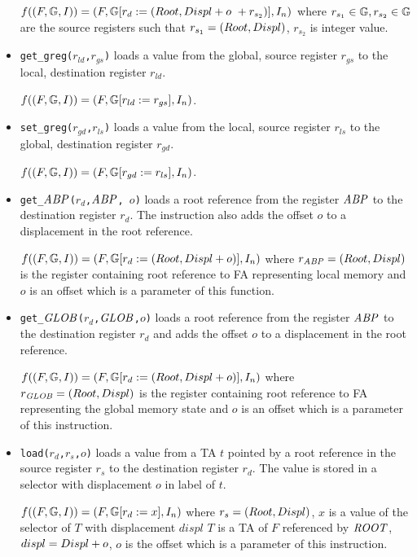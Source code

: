 \begin{itemize}
		$f((F, \mathbb{G}, I)) = (F, \mathbb{G} [r_d := (Root,Displ + o~+ r_{s_2})], I_n)$
		where $r_{s_1} \in \mathbb{G}, r_{s_2} \in \mathbb{G}$ are the source registers such that
		$r_{s_1}=(Root,Displ)$, $r_{s_2}$ is integer value.
	
	\item {\tt get\_greg($r_{ld}$,$r_{gs}$)} loads a value from the global, source register $r_{gs}$ to
		the local, destination register $r_{ld}$.
		
		$f((F, \mathbb{G}, I)) = (F, \mathbb{G} [r_{ld} := r_{gs}], I_n)$.
	
	\item {\tt set\_greg($r_{gd}$,$r_{ls}$)} loads a value from the local, source register $r_{ls}$ to
		the global, destination register $r_{gd}$.
		
		$f((F, \mathbb{G}, I)) = (F, \mathbb{G} [r_{gd} := r_{ls}], I_n)$.
	
	\item {\tt get\_$\mathit{ABP}$($r_d$,$\mathit{ABP}$, $o$)} loads a root reference from the register $\mathit{ABP}$ to
		the destination register $r_d$. The instruction also adds the offset $o$ to a displacement
		in the root reference.

		$f((F, \mathbb{G}, I)) = (F, \mathbb{G} [r_d := 
			(Root,Displ + o)], I_n)$ where $r_{\mathit{ABP}}=(Root,Displ)$ is the register containing root
		reference to FA representing local memory and $o$ is an offset
		which is a parameter of this function.
	
	\item {\tt get\_$\mathit{GLOB}$($r_d$,$\mathit{GLOB}$,$o$)} loads a root reference from the register $\mathit{ABP}$
		to the destination register $r_d$ and adds the offset $o$ to a displacement in the root reference.
		
		$f((F, \mathbb{G}, I)) = (F, \mathbb{G} [r_{d} := 
				(Root,Displ + o)
			], I_n)$ where $r_{\mathit{GLOB}}=(Root,Displ)$ is the register containing root
			reference to FA representing the global memory state and $o$ is an offset
			which is a parameter of this instruction.
	
	\item {\tt load($r_d$,$r_s$,$o$)} loads a value from a TA $t$ pointed
		by a root reference in the source register $r_s$ to the destination register $r_d$.
		The value is stored in a selector with displacement $o$ in label of $t$.
		
		$f((F, \mathbb{G}, I)) = (F, \mathbb{G} [r_{d} := 
				x
			], I_n)$
			where $r_{s}=(Root,Displ)$,
			$x$ is a value of the selector of $T$ with displacement $\mathit{displ}$
			$T$ is a TA of $F$ referenced by $\mathit{ROOT}$,
			$displ=Displ + o$,
			$o$ is the offset which is a parameter of this instruction.


\end{itemize}
